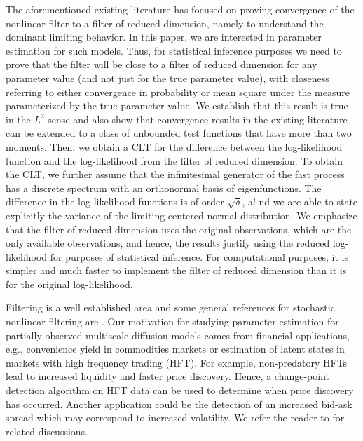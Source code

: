 \documentclass{article}
\begin{document}
The aforementioned existing literature has focused on proving convergence of the nonlinear filter to a filter of reduced dimension, namely to understand the dominant limiting behavior.
In this paper, we are interested in parameter estimation for such models. Thus, for statistical inference purposes we need to prove that the filter will be close to a filter of reduced dimension for any parameter value (and not just for the true parameter value), with closeness referring to either convergence in probability or mean square under the measure parameterized by the true parameter value. We establish that this result is true in the $L^{2}$-sense and also show that convergence results in the existing literature can be extended to a class of unbounded test functions that have more than two moments. Then, we obtain a CLT for the difference between the log-likelihood function and the log-likelihood from the filter of reduced dimension. To obtain the CLT, we further assume that the infinitesimal generator of the fast process has a discrete spectrum with an orthonormal basis of eigenfunctions. The difference in the log-likelihood functions is of order $\sqrt{\delta}$, a!
 nd we are able to state explicitly the variance of the limiting centered normal distribution. We emphasize that the filter of reduced dimension uses the original observations, which are the only available observations, and hence, the results justify using the reduced log-likelihood for purposes of statistical inference. For computational purposes, it is simpler and much faster to implement the filter of reduced dimension than it is for the original log-likelihood.

Filtering is a well established area and some general references for stochastic nonlinear filtering are \cite{bainCrisan,Kallianpur,Kushner,Rozovskii}. Our motivation for studying parameter estimation for partially observed multiscale diffusion models comes from financial applications, e.g., convenience yield in commodities markets or estimation of latent states in markets with high frequency trading (HFT). For example, non-predatory HFTs lead to increased liquidity and faster price discovery. Hence, a change-point detection algorithm on HFT data can be used to determine when price discovery has occurred. Another application could be the detection of an increased bid-ask spread which may correspond to increased volatility. We refer the reader to \cite{hendershot,zhang} for related discussions.
\end{document}
